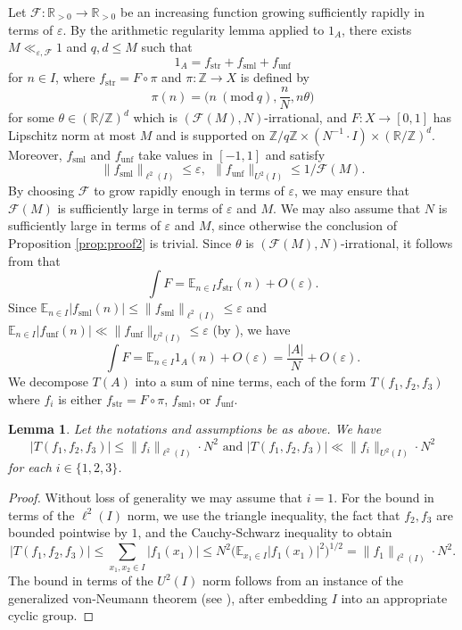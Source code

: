 \documentclass[12pt, notitlepage]{amsart}
\numberwithin{equation}{section}
\def\R{\mathbb R}
\def\Z{\mathbb Z}
\def\E{\mathbb E}
\def\CF{\mathcal F}
\newcommand{\eps}{\varepsilon}
\newcommand{\str}{\operatorname{str}}
\newcommand{\sml}{\operatorname{sml}}
\newcommand{\unf}{\operatorname{unf}}
\newcommand{\Mod}[1]{\ (\mathrm{mod}\ #1)}
\newtheorem{lemma}[theorem]{Lemma}
\theoremstyle{remark}
\theoremstyle{definition}
\theoremstyle{remark}
\numberwithin{equation}{section}
\begin{document}
Let $\CF:\R_{>0}\rightarrow\R_{>0}$ be an increasing function growing sufficiently rapidly in terms of $\eps$. By the arithmetic regularity lemma applied to $1_A$, there exists $M \ll_{\eps,\CF}1$ and $q,d \leq M$ such that
$$
1_A = f_{\str} + f_{\sml} + f_{\unf}
$$ 
for $n \in I$, where $f_{\str} = F\circ \pi$ and $\pi: \Z\rightarrow X$ is defined by
$$
\pi(n) = \Big(n\Mod{q}, \frac{n}{N}, n\theta\Big)
$$
for some $\theta \in (\R/\Z)^d$ which is $(\CF(M), N)$-irrational, and $F: X\rightarrow [0,1]$ has Lipschitz norm at most $M$ and is supported on $\Z/q\Z \times (N^{-1}\cdot I)\times (\R/\Z)^d$. Moreover, $f_{\sml}$ and $f_{\unf}$ take values in $[-1,1]$ and satisfy 
$$
\|f_{\sml}\|_{\ell^2(I)} \leq \eps, \ \ \|f_{\unf}\|_{U^2(I)} \leq 1/\CF(M).
$$
By choosing $\CF$ to grow rapidly enough in terms of $\eps$, we may ensure that $\CF(M)$ is sufficiently large in terms of $\eps$ and $M$. We may also assume that $N$ is sufficiently large in terms of $\eps$ and $M$, since otherwise the conclusion of Proposition \ref{prop:proof2} is trivial. Since $\theta$ is $(\CF(M),N)$-irrational, it follows from \cite[Lemma A.4]{EberhardGreenManners} that
$$
\int F = \E_{n \in I} f_{\str}(n) + O(\eps).
$$
Since $\E_{n \in I}|f_{\sml}(n)| \leq \|f_{\sml}\|_{\ell^2(I)} \leq \eps$ and $\E_{n \in I} |f_{\unf}(n)| \ll \|f_{\unf}\|_{U^2(I)} \leq \eps$ (by \cite[Lemma A.8]{EberhardGreenManners}), we have
$$
\int F = \E_{n \in I} 1_A(n) + O(\eps) = \frac{|A|}{N} + O(\eps).
$$
We decompose $T(A)$ into a sum of nine terms, each of the form $T(f_1, f_2, f_3)$ where $f_i$ is either $f_{\str} = F\circ\pi$, $f_{\sml}$, or $f_{\unf}$.

\begin{lemma}\label{lem:l2-u2-control}
Let the notations and assumptions be as above. We have
$$
|T(f_1,f_2,f_3)| \leq \|f_i\|_{\ell^2(I)}\cdot N^2 \text{ and }|T(f_1,f_2,f_3)| \ll \|f_i\|_{U^2(I)}\cdot N^2
$$
for each $i\in\{1,2,3\}$.
\end{lemma}

\begin{proof}
Without loss of generality we may assume that $i=1$. For the bound in terms of the $\ell^2(I)$ norm, we use the triangle inequality, the fact that $f_2,f_3$ are bounded pointwise by $1$, and the Cauchy-Schwarz inequality to obtain
$$
|T(f_1,f_2,f_3)| \leq \sum_{x_1,x_2 \in I} |f_1(x_1)| \leq  N^2 \Big(\E_{x_1 \in I}|f_1(x_1)|^2\Big)^{1/2} = \|f_1\|_{\ell^2(I)} \cdot N^2.
$$
The bound in terms of the $U^2(I)$ norm follows from an instance of the generalized von-Neumann theorem (see \cite[Lemma 11.4]{TaoVu-book}), after embedding $I$ into an appropriate cyclic group.    
\end{proof}
\end{document}
